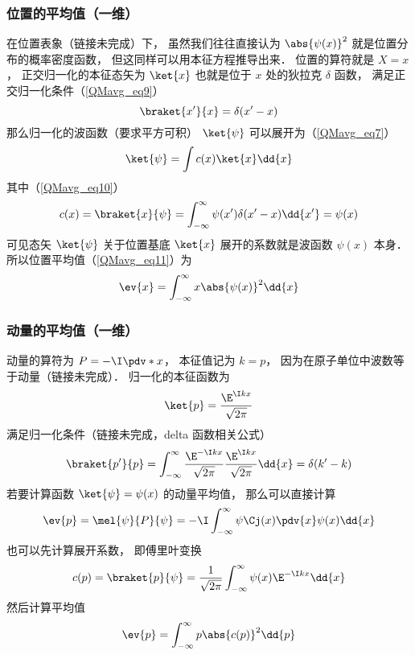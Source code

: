 \subsubsection{位置的平均值（一维）}
在位置表象（链接未完成）下， 虽然我们往往直接认为 $\abs{\psi(x)}^2$ 就是位置分布的概率密度函数， 但这同样可以用本征方程推导出来． 位置的算符就是 $X = x$， 正交归一化的本征态矢为 $\ket{x}$ 也就是位于 $x$ 处的狄拉克 $\delta$ 函数， 满足正交归一化条件（\autoref{QMavg_eq9}）
\begin{equation}
\braket{x'}{x} = \delta(x'-x)
\end{equation}
那么归一化的波函数（要求平方可积） $\ket{\psi}$ 可以展开为（\autoref{QMavg_eq7}）
\begin{equation}
\ket{\psi} = \int c(x) \ket{x}\dd{x}
\end{equation}
其中（\autoref{QMavg_eq10}）
\begin{equation}
c(x) = \braket{x}{\psi} = \int_{-\infty}^\infty \psi(x')\delta(x'-x)\dd{x'} = \psi(x)
\end{equation}
可见态矢 $\ket{\psi}$ 关于位置基底 $\ket{x}$ 展开的系数就是波函数 $\psi(x)$ 本身． 所以位置平均值（\autoref{QMavg_eq11}）为
\begin{equation}
\ev{x} = \int_{-\infty}^\infty x \abs{\psi(x)}^2 \dd{x}
\end{equation}


\subsubsection{动量的平均值（一维）}
动量的算符为 $P = -\I\pdv*{x}$， 本征值记为 $k = p$， 因为在原子单位中波数等于动量（链接未完成）． 归一化的本征函数为
\begin{equation}
\ket{p} = \frac{\E^{\I k x}}{\sqrt{2\pi}}
\end{equation}
满足归一化条件（链接未完成，delta 函数相关公式）
\begin{equation}
\braket{p'}{p} = \int_{-\infty}^{\infty} \frac{\E^{-\I k x}}{\sqrt{2\pi}} \frac{\E^{\I k x}}{\sqrt{2\pi}} \dd{x} = \delta(k' - k)
\end{equation}
若要计算函数 $\ket{\psi} = \psi(x)$ 的动量平均值， 那么可以直接计算
\begin{equation}
\ev{p} = \mel{\psi}{P}{\psi} = -\I\int_{-\infty}^{\infty} \psi\Cj(x) \pdv{x} \psi(x) \dd{x}
\end{equation}
也可以先计算展开系数， 即傅里叶变换
\begin{equation}
c(p) = \braket{p}{\psi} = \frac{1}{\sqrt{2\pi}}\int_{-\infty}^{\infty} \psi(x)\E^{-\I kx} \dd{x}
\end{equation}
然后计算平均值
\begin{equation}
\ev{p} = \int_{-\infty}^{\infty} p \abs{c(p)}^2\dd{p}
\end{equation}

